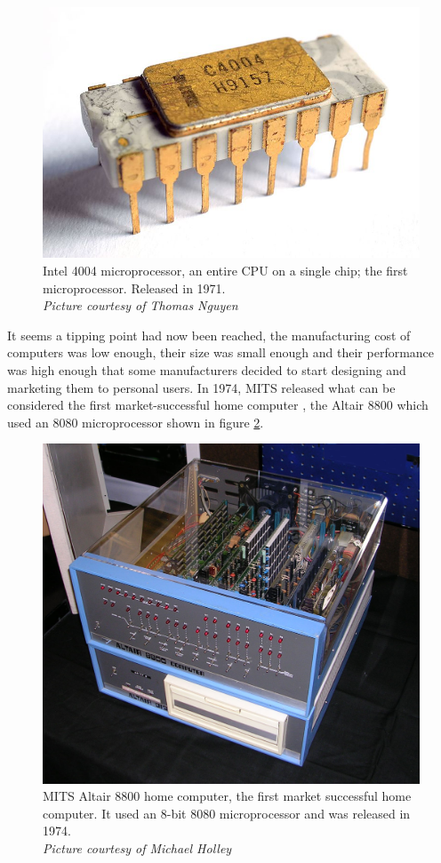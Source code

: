 \begin{figure} \begin{center}
\includegraphics[width=.3\linewidth]{pics/intel_4004} 
\end{center} 
\caption{Intel 4004 microprocessor, an entire CPU on a single chip; the first microprocessor. Released in 1971.\\ \textit{\small{Picture courtesy of Thomas Nguyen}}}
\label{Intel4004}
\end{figure} 

It seems a tipping point had now been reached, the manufacturing cost of computers was low enough, their size was small enough and their performance was high enough that some manufacturers decided to start designing and marketing them to personal users. In 1974, MITS released what can be considered the first market-successful home computer 
\cite{RN41}, the Altair 8800 which used an 8080 microprocessor shown in figure \ref{Altair8800}.

\begin{figure} \begin{center}
\includegraphics[width=.3\linewidth]{pics/altair_8800_computer} 
\end{center} 
\caption{MITS Altair 8800 home computer, the first market successful home computer. It used an 8-bit 8080 microprocessor and was released in 1974.\\ \textit{\small{Picture courtesy of  Michael Holley}}}
\label{Altair8800}
\end{figure}

